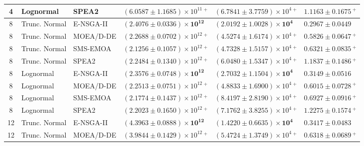 \documentclass[11pt, a4paper]{article}
\begin{document}
\begin{table}[!htb]
{\begin{tabular}{@{}clllll@{}}
4 & Lognormal & SPEA2
& $(6.0587 \pm 1.1685)\times10^{11}\,{}^{+}$
& $(6.7841 \pm 3.7759)\times10^{4}\,{}^{+}$
& $1.1163 \pm 0.1675\,{}^{+}$ \\

\midrule

8 & Trunc. Normal & E-NSGA-II
& $\mathbf{(2.4076 \pm 0.0336)\times10^{12}}$
& $\mathbf{(2.0192 \pm 1.0028)\times10^{4}}$
& $\mathbf{0.2967 \pm 0.0449}$ \\

8 & Trunc. Normal & MOEA/D-DE
& $(2.2688 \pm 0.0702)\times10^{12}\,{}^{+}$
& $(4.5274 \pm 1.6174)\times10^{4}\,{}^{+}$
& $0.5826 \pm 0.0647\,{}^{+}$ \\

8 & Trunc. Normal & SMS-EMOA
& $(2.1256 \pm 0.1057)\times10^{12}\,{}^{+}$
& $(4.7328 \pm 1.5157)\times10^{4}\,{}^{+}$
& $0.6321 \pm 0.0835\,{}^{+}$ \\

8 & Trunc. Normal & SPEA2
& $(2.2484 \pm 0.1340)\times10^{12}\,{}^{+}$
& $(6.0480 \pm 1.5347)\times10^{4}\,{}^{+}$
& $1.1837 \pm 0.1486\,{}^{+}$ \\

\midrule

8 & Lognormal & E-NSGA-II
& $\mathbf{(2.3576 \pm 0.0748)\times10^{12}}$
& $\mathbf{(2.7032 \pm 1.1504)\times10^{4}}$
& $\mathbf{0.3149 \pm 0.0516}$ \\

8 & Lognormal & MOEA/D-DE
& $(2.2513 \pm 0.0751)\times10^{12}\,{}^{+}$
& $(4.8833 \pm 1.6900)\times10^{4}\,{}^{+}$
& $0.6015 \pm 0.0728\,{}^{+}$ \\

8 & Lognormal & SMS-EMOA
& $(2.1774 \pm 0.1437)\times10^{12}\,{}^{+}$
& $(8.4197 \pm 2.8190)\times10^{4}\,{}^{+}$
& $0.6927 \pm 0.0916\,{}^{+}$ \\

8 & Lognormal & SPEA2
& $(2.2023 \pm 0.1650)\times10^{12}\,{}^{+}$
& $(7.1762 \pm 3.8255)\times10^{4}\,{}^{+}$
& $1.2275 \pm 0.1574\,{}^{+}$ \\

\midrule

12 & Trunc. Normal & E-NSGA-II
& $\mathbf{(4.3963 \pm 0.0888)\times10^{12}}$
& $\mathbf{(1.4220 \pm 0.6635)\times10^{4}}$
& $\mathbf{0.3417 \pm 0.0483}$ \\

12 & Trunc. Normal & MOEA/D-DE
& $(3.9844 \pm 0.1429)\times10^{12}\,{}^{+}$
& $(5.4724 \pm 1.3749)\times10^{4}\,{}^{+}$
& $0.6318 \pm 0.0689\,{}^{+}$ \\


\end{tabular}}
\end{table}
\end{document}
